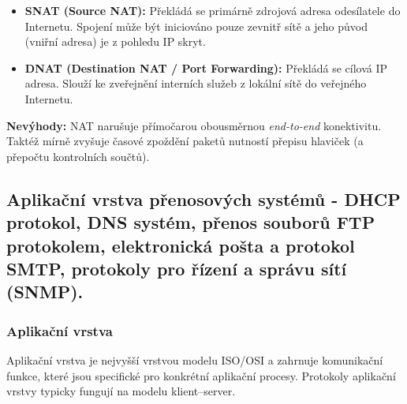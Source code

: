         \begin{itemize}
            \item \textbf{SNAT (Source NAT):} Překládá se primárně zdrojová adresa odesílatele do Internetu. Spojení může být iniciováno pouze zevnitř sítě a jeho původ (vniřní adresa) je z pohledu IP skryt.
            \item \textbf{DNAT (Destination NAT / Port Forwarding):} Překládá se cílová IP adresa. Slouží ke zveřejnění interních služeb z lokální sítě do veřejného Internetu.
        \end{itemize}
            \textbf{Nevýhody:} NAT narušuje přímočarou obousměrnou \textit{end-to-end} konektivitu. Taktéž mírně zvyšuje časové zpoždění paketů nutností přepisu hlaviček (a přepočtu kontrolních součtů).
\subsection{Aplikační vrstva přenosových systémů - DHCP protokol, DNS systém, přenos souborů FTP protokolem, elektronická pošta a protokol SMTP, protokoly pro řízení a správu sítí (SNMP). }
    \subsubsection{Aplikační vrstva}
        Aplikační vrstva je nejvyšší vrstvou modelu ISO/OSI a zahrnuje komunikační funkce, které jsou specifické pro konkrétní aplikační procesy. Protokoly aplikační vrstvy typicky fungují na modelu klient--server.
